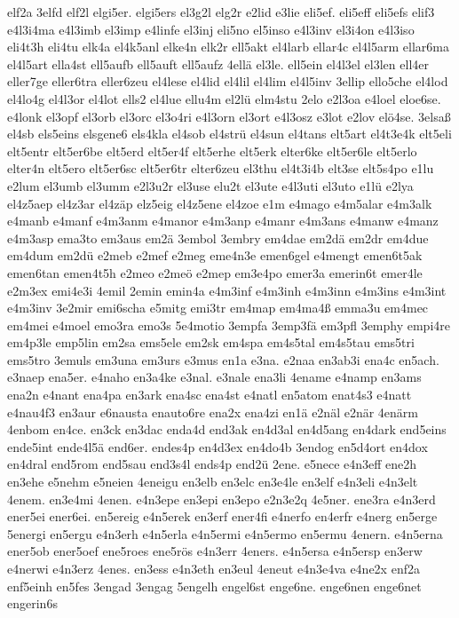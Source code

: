 {elf2a
3elfd
elf2l
elgi5er.
elgi5ers
el3g2l
elg2r
e2lid
e3lie
eli5ef.
eli5eff
eli5efs
elif3
e4l3i4ma
e4l3imb
el3imp
e4linfe
el3inj
eli5no
el5inso
e4l3inv
el3i4on
e4l3iso
eli4t3h
eli4tu
elk4a
el4k5anl
elke4n
elk2r
ell5akt
el4larb
ellar4c
el4l5arm
ellar6ma
el4l5art
ella4st
ell5aufb
ell5auft
ell5aufz
4ellä
el3le.
ell5ein
el4l3el
el3len
ell4er
eller7ge
eller6tra
eller6zeu
el4lese
el4lid
el4lil
el4lim
el4l5inv
3ellip
ello5che
el4lod
el4lo4g
el4l3or
el4lot
ells2
el4lue
ellu4m
el2lü
elm4stu
2elo
e2l3oa
e4loel
eloe6se.
e4lonk
el3opf
el3orb
el3orc
el3o4ri
e4l3orn
el3ort
e4l3osz
e3lot
e2lov
elö4se.
3elsaß
el4sb
els5eins
elsgene6
els4kla
el4sob
el4strü
el4sun
el4tans
elt5art
el4t3e4k
elt5eli
elt5entr
elt5er6be
elt5erd
elt5er4f
elt5erhe
elt5erk
elter6ke
elt5er6le
elt5erlo
elter4n
elt5ero
elt5er6sc
elt5er6tr
elter6zeu
el3thu
el4t3i4b
elt3se
elt5s4po
e1lu
e2lum
el3umb
el3umm
e2l3u2r
el3use
elu2t
el3ute
e4l3uti
el3uto
e1lü
e2lya
el4z5aep
el4z3ar
el4zäp
elz5eig
el4z5ene
el4zoe
e1m
e4mago
e4m5alar
e4m3alk
e4manb
e4manf
e4m3anm
e4manor
e4m3anp
e4manr
e4m3ans
e4manw
e4manz
e4m3asp
ema3to
em3aus
em2ä
3embol
3embry
em4dae
em2dä
em2dr
em4due
em4dum
em2dü
e2meb
e2mef
e2meg
eme4n3e
emen6gel
e4mengt
emen6t5ak
emen6tan
emen4t5h
e2meo
e2meö
e2mep
em3e4po
emer3a
emerin6t
emer4le
e2m3ex
emi4e3i
4emil
2emin
emin4a
e4m3inf
e4m3inh
e4m3inn
e4m3ins
e4m3int
e4m3inv
3e2mir
emi6scha
e5mitg
emi3tr
em4map
em4ma4ß
emma3u
em4mec
em4mei
e4moel
emo3ra
emo3s
5e4motio
3empfa
3emp3fä
em3pfl
3emphy
empi4re
em4p3le
emp5lin
em2sa
ems5ele
em2sk
em4spa
em4s5tal
em4s5tau
ems5tri
ems5tro
3emuls
em3una
em3urs
e3mus
en1a
e3na.
e2naa
en3ab3i
ena4c
en5ach.
e3naep
ena5er.
e4naho
en3a4ke
e3nal.
e3nale
ena3li
4ename
e4namp
en3ams
ena2n
e4nant
ena4pa
en3ark
ena4sc
ena4st
e4natl
en5atom
enat4s3
e4natt
e4nau4f3
en3aur
e6nausta
enauto6re
ena2x
ena4zi
en1ä
e2näl
e2när
4enärm
4enbom
en4ce.
en3ck
en3dac
enda4d
end3ak
en4d3al
en4d5ang
en4dark
end5eins
ende5int
ende4l5ä
end6er.
endes4p
en4d3ex
en4do4b
3endog
en5d4ort
en4dox
en4dral
end5rom
end5sau
end3s4l
ends4p
end2ü
2ene.
e5nece
e4n3eff
ene2h
en3ehe
e5nehm
e5neien
4eneigu
en3elb
en3elc
en3e4le
en3elf
e4n3eli
e4n3elt
4enem.
en3e4mi
4enen.
e4n3epe
en3epi
en3epo
e2n3e2q
4e5ner.
ene3ra
e4n3erd
ener5ei
ener6ei.
en5ereig
e4n5erek
en3erf
ener4fi
e4nerfo
en4erfr
e4nerg
en5erge
5energi
en5ergu
e4n3erh
e4n5erla
e4n5ermi
e4n5ermo
en5ermu
4enern.
e4n5erna
ener5ob
ener5oef
ene5roes
ene5rös
e4n3err
4eners.
e4n5ersa
e4n5ersp
en3erw
e4nerwi
e4n3erz
4enes.
en3ess
e4n3eth
en3eul
4eneut
e4n3e4va
e4ne2x
enf2a
enf5einh
en5fes
3engad
3engag
5engelh
engel6st
enge6ne.
enge6nen
enge6net
engerin6s
}
